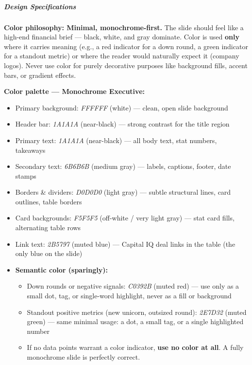 \documentclass[11pt]{article}
\begin{document}
\subparagraph{Design Specifications}\mbox{}\par

\textbf{Color philosophy: Minimal, monochrome-first.} The slide should feel like a high-end financial brief — black, white, and gray dominate. Color is used \textbf{only} where it carries meaning (e.g., a red indicator for a down round, a green indicator for a standout metric) or where the reader would naturally expect it (company logos). Never use color for purely decorative purposes like background fills, accent bars, or gradient effects.


\textbf{Color palette — Monochrome Executive:}

\begin{itemize}[leftmargin=*,itemsep=2pt,topsep=2pt]
\item {} Primary background: \emph{FFFFFF} (white) — clean, open slide background
\item {} Header bar: \emph{1A1A1A} (near-black) — strong contrast for the title region
\item {} Primary text: \emph{1A1A1A} (near-black) — all body text, stat numbers, takeaways
\item {} Secondary text: \emph{6B6B6B} (medium gray) — labels, captions, footer, date stamps
\item {} Borders \& dividers: \emph{D0D0D0} (light gray) — subtle structural lines, card outlines, table borders
\item {} Card backgrounds: \emph{F5F5F5} (off-white / very light gray) — stat card fills, alternating table rows
\item {} Link text: \emph{2B5797} (muted blue) — Capital IQ deal links in the table (the only blue on the slide)
\item {} \textbf{Semantic color (sparingly):}
\begin{itemize}[leftmargin=*,itemsep=2pt,topsep=2pt]
\item {} Down rounds or negative signals: \emph{C0392B} (muted red) — use only as a small dot, tag, or single-word highlight, never as a fill or background
\item {} Standout positive metrics (new unicorn, outsized round): \emph{2E7D32} (muted green) — same minimal usage: a dot, a small tag, or a single highlighted number
\item {} If no data points warrant a color indicator, \textbf{use no color at all}. A fully monochrome slide is perfectly correct.
\end{itemize}
\end{itemize}
\end{document}
